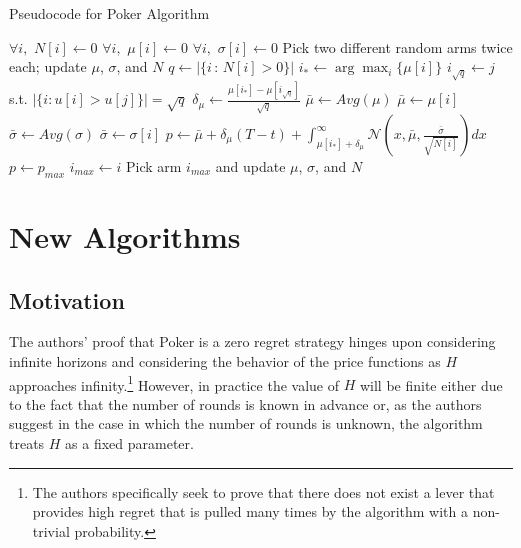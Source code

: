 \documentclass[12pt]{article}
\begin{document}
\begin{algorithm}
\scriptsize
  \caption{Pseudocode for Poker Algorithm}
  \begin{algorithmic}
  \State $\forall i, \, \, N[i] \gets 0$ 
  \State $\forall i, \, \, \mu[i] \gets 0$ 
  \State $\forall i, \, \, \sigma[i] \gets 0$ 
  \State
  \State Pick two different random arms twice each; update $\mu$, $\sigma$, and $N$
        \State $q \gets |\{i \, : \, N[i] > 0\}|$
        \State $i_{*} \gets \arg \max_{i} \{\mu[i]\}$
        \State $i_{\sqrt{q}} \gets j$ s.t. $|\{i : u[i] > u[j]\}| = \sqrt{q}$
        \State $\delta_{\mu} \gets \frac{\mu[i_{*}] - \mu[i_{\sqrt{q}}]}{\sqrt{q}}$ 
                \State $\bar{\mu} \gets Avg(\mu)$ 
            \Else 
                \State $\bar{\mu} \gets \mu[i]$ 
            \EndIf
                \State $\bar{\sigma} \gets Avg(\sigma)$ 
            \Else
                \State $\bar{\sigma} \gets \sigma[i]$ 
            \EndIf
        \State $p \gets \bar{\mu} + \delta_{\mu}(T - t) + \int_{\mu[i_*] + \delta_{\mu}}^{\infty} \mathcal{N}\left(x, \bar{\mu}, \frac{\bar{\sigma}}{\sqrt{N[i]}} \right) dx$
            \State$p \gets p_{max}$
            \State $i_{max} \gets i$ 
        \EndIf
        \EndFor
        \State Pick arm $i_{max}$ and update $\mu$, $\sigma$, and $N$
    \EndFor
  \end{algorithmic}
\end{algorithm}


\section{New Algorithms}

\subsection{Motivation}

The authors' proof that Poker is a zero regret strategy hinges upon considering infinite horizons and considering the behavior of the price functions as $H$ approaches infinity.\footnote{The authors specifically seek to prove that there does not exist a lever that provides high regret that is pulled many times by the algorithm with a non-trivial probability.} However, in practice the value of $H$ will be finite either due to the fact that the number of rounds is known in advance or, as the authors suggest in the case in which the number of rounds is unknown, the algorithm treats $H$ as a fixed parameter.
\end{document}
